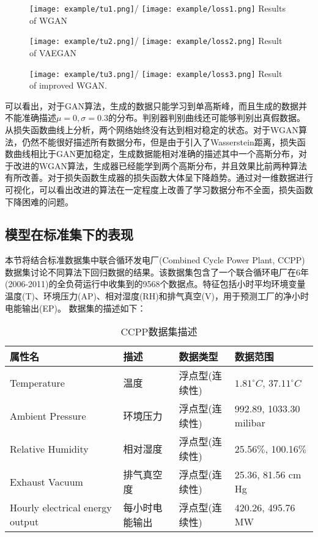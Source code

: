 \begin{figure}[htbp]
	\centering
	\texttt{[image: example/tu1.png]}/
	\hspace{2cm}
	\texttt{[image: example/loss1.png]}
	{Results of WGAN}
	\label{fig:al1}
\end{figure}
\begin{figure}[htbp]
	\centering
	\texttt{[image: example/tu2.png]}/
	\hspace{2cm}
	\texttt{[image: example/loss2.png]}
	{Result of VAEGAN}
	\label{fig:al2}
\end{figure}
\begin{figure}[htbp]
	\centering
	\texttt{[image: example/tu3.png]}/
	\hspace{2cm}
	\texttt{[image: example/loss3.png]}
	{Result of improved WGAN.}
	\label{fig:al3}
\end{figure}
可以看出，对于GAN算法，生成的数据只能学习到单高斯峰，而且生成的数据并不能准确描述$\mu=0,\sigma=0.3$的分布。判别器判别曲线还可能够判别出真假数据。从损失函数曲线上分析，两个网络始终没有达到相对稳定的状态。对于WGAN算法，仍然不能很好描述所有数据分布，但是由于引入了Wasserstein距离，损失函数曲线相比于GAN更加稳定，生成数据能相对准确的描述其中一个高斯分布，对于改进的WGAN算法，生成器已经能学到两个高斯分布，并且效果比前两种算法有所改善。对于损失函数生成器的损失函数大体呈下降趋势。通过对一维数据进行可视化，可以看出改进的算法在一定程度上改善了学习数据分布不全面，损失函数下降困难的问题。
\subsection{模型在标准集下的表现}
本节将结合标准数据集中联合循环发电厂(Combined Cycle Power Plant, CCPP)数据集讨论不同算法下回归数据的结果。该数据集包含了一个联合循环电厂在6年(2006-2011)的全负荷运行中收集到的9568个数据点。特征包括小时平均环境变量温度(T)、环境压力(AP)、相对湿度(RH)和排气真空(V)，用于预测工厂的净小时电能输出(EP)。
数据集的描述如下：
\begin{table}[htpb]
	\centering
	\caption{CCPP数据集描述}
	\label{tabccpp}
	\begin{tabular}{llll} \toprule
		属性名   & 描述 & 数据类型&数据范围  \\  \midrule
		Temperature&温度&浮点型(连续性)&$1.81^\circ C$, $37.11^\circ C$\\
		Ambient Pressure&环境压力&浮点型(连续性)&992.89, 1033.30 milibar\\
		Relative Humidity&相对湿度&浮点型(连续性)& 25.56$\%$, 100.16$\%$ \\
		Exhaust Vacuum&排气真空度&浮点型(连续性)&25.36, 81.56 cm Hg\\
		Hourly electrical energy output&每小时电能输出&浮点型(连续性)&420.26, 495.76 MW\\ \bottomrule
	\end{tabular}
\end{table}

